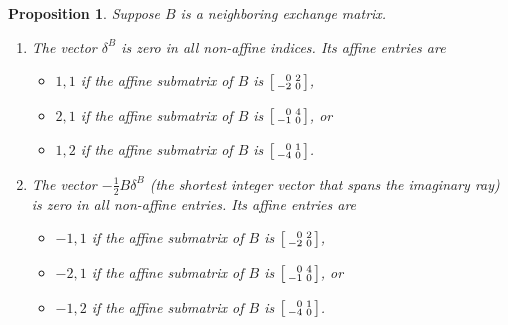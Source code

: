 \documentclass{amsart}
\newtheorem{proposition}{Proposition}[section]
\theoremstyle{definition}
\theoremstyle{remark}
\numberwithin{equation}{section}
\newcommand{\0}{{\mathbf{0}}}
\begin{document}
\begin{proposition}\label{neigh good stuff}
Suppose $B$ is a neighboring exchange matrix.
\begin{enumerate}[\quad\bf1.]
\item\label{neigh delta}
The vector $\delta^B$ is zero in all non-affine indices.
Its affine entries are
\begin{itemize}
\item
$1,1$ if the affine submatrix of $B$ is $\begin{bsmallmatrix*}[r]0&2\\-2&0\end{bsmallmatrix*}$,
\item
$2,1$ if the affine submatrix of $B$ is $\begin{bsmallmatrix*}[r]0&4\\-1&0\end{bsmallmatrix*}$, or
\item
$1,2$ if the affine submatrix of $B$ is $\begin{bsmallmatrix*}[r]0&1\\-4&0\end{bsmallmatrix*}$.
\end{itemize}
\item\label{neigh im ray}
The vector $-\frac12B\delta^B$ (the shortest integer vector that spans the imaginary ray) is zero in all non-affine entries.
Its affine entries are
\begin{itemize}
\item
$-1,1$ if the affine submatrix of $B$ is $\begin{bsmallmatrix*}[r]0&2\\-2&0\end{bsmallmatrix*}$,
\item
$-2,1$ if the affine submatrix of $B$ is $\begin{bsmallmatrix*}[r]0&4\\-1&0\end{bsmallmatrix*}$, or
\item
$-1,2$ if the affine submatrix of $B$ is $\begin{bsmallmatrix*}[r]0&1\\-4&0\end{bsmallmatrix*}$.
\end{itemize}
\end{enumerate}
\end{proposition}
\end{document}
